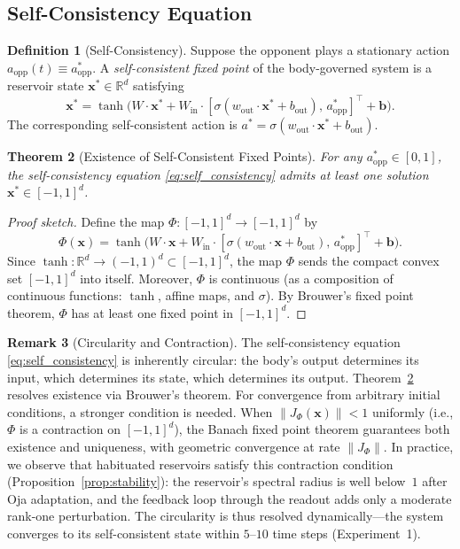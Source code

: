 \documentclass[11pt,a4paper]{article}
\newtheorem{theorem}{Theorem}[section]
\theoremstyle{definition}
\newtheorem{definition}[theorem]{Definition}
\newtheorem{remark}[theorem]{Remark}
\newcommand{\R}{\mathbb{R}}
\newcommand{\Wres}{W}
\newcommand{\Wout}{w_{\mathrm{out}}}
\newcommand{\Win}{W_{\mathrm{in}}}
\newcommand{\xstate}{\mathbf{x}}
\newcommand{\bout}{b_{\mathrm{out}}}
\begin{document}
\subsection{Self-Consistency Equation}

\begin{definition}[Self-Consistency]
\label{def:self_consistency}
Suppose the opponent plays a stationary action $a_{\mathrm{opp}}(t) \equiv
a_{\mathrm{opp}}^{*}$.  A \emph{self-consistent fixed point} of the
body-governed system is a reservoir state $\xstate^{*} \in \R^d$ satisfying
\begin{equation}
\label{eq:self_consistency}
\xstate^{*} = \tanh\bigl(\Wres \cdot \xstate^{*} + \Win \cdot
  [\sigma(\Wout \cdot \xstate^{*} + \bout),\, a_{\mathrm{opp}}^{*}]^{\top}
  + \mathbf{b}\bigr).
\end{equation}
The corresponding self-consistent action is
$a^{*} = \sigma(\Wout \cdot \xstate^{*} + \bout)$.
\end{definition}

\begin{theorem}[Existence of Self-Consistent Fixed Points]
\label{thm:existence}
For any $a_{\mathrm{opp}}^{*} \in [0,1]$, the self-consistency equation
\eqref{eq:self_consistency} admits at least one solution
$\xstate^{*} \in [-1,1]^d$.
\end{theorem}

\begin{proof}[Proof sketch]
Define the map $\Phi: [-1,1]^d \to [-1,1]^d$ by
\[
\Phi(\xstate) = \tanh\bigl(\Wres \cdot \xstate + \Win \cdot
  [\sigma(\Wout \cdot \xstate + \bout),\, a_{\mathrm{opp}}^{*}]^{\top}
  + \mathbf{b}\bigr).
\]
Since $\tanh: \R^d \to (-1,1)^d \subset [-1,1]^d$, the map $\Phi$ sends
the compact convex set $[-1,1]^d$ into itself.  Moreover, $\Phi$ is
continuous (as a composition of continuous functions: $\tanh$, affine maps,
and $\sigma$).  By Brouwer's fixed point theorem, $\Phi$ has at least one
fixed point in $[-1,1]^d$.
\end{proof}

\begin{remark}[Circularity and Contraction]
\label{rem:circularity}
The self-consistency equation \eqref{eq:self_consistency} is inherently
circular: the body's output determines its input, which determines its
state, which determines its output.  Theorem~\ref{thm:existence} resolves
existence via Brouwer's theorem.  For convergence from arbitrary initial
conditions, a stronger condition is needed.  When $\|J_\Phi(\xstate)\| < 1$
uniformly (i.e., $\Phi$ is a contraction on $[-1,1]^d$), the Banach fixed
point theorem guarantees both existence and uniqueness, with geometric
convergence at rate $\|J_\Phi\|$.  In practice, we observe that habituated
reservoirs satisfy this contraction condition
(Proposition~\ref{prop:stability}): the reservoir's spectral radius is
well below~$1$ after Oja adaptation, and the feedback loop through the
readout adds only a moderate rank-one perturbation.  The circularity is
thus resolved dynamically---the system converges to its self-consistent
state within $5$--$10$ time steps (Experiment~1).
\end{remark}
\end{document}
